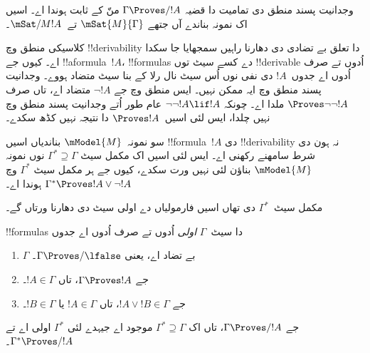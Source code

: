 \documentclass[../../../include/open-logic-section]{subfiles}
\begin{document}


وجدانیت پسند منطق دی تمامیت دا قضیہ $\Gamma \Proves/ !A$ منّ کے ثابت
ہوندا اے۔ اسیں اک نمونہ بناندے آں جتھے $\mSat{M}{\Gamma}$ تے~$\mSat/{M}{!A}$۔

کلاسیکی منطق وچ !!{derivability} دا تعلق بے تضادی دی دھارنا راہیں سمجھایا
جا سکدا اے۔ کیوں جے !!a{formula}~$!A$، !!{formula}s دے کسے سیٹ توں !!{derivable}
اُدوں تے صرف اُدوں اے جدوں~$!A$ دی نفی نوں اُس سیٹ نال رلا کے بنا سیٹ متضاد
ہووے۔ وجدانیت پسند منطق وچ ایہ ممکن نہیں۔ ایس منطق وچ جے $\lnot!A$ متضاد
اے، تاں صرف $\Proves \lnot\lnot !A$ ملدا اے۔ چونکہ $\lnot\lnot!A \lif !A$
عام طور اُتے وجدانیت پسند منطق وچ نہیں چلدا، ایس لئی اسیں~$\Proves !A$ دا
نتیجہ نہیں کڈھ سکدے۔

سو نمونہ~$\mModel{M}$ بناندیاں اسیں !!{formula}~$!A$ دی !!{derivability} نہ ہون دی شرط
سامھنے رکھنی اے۔ ایس لئی اسیں اک مکمل سیٹ $\Gamma^* \supseteq \Gamma$ نوں
نمونہ $\mModel{M}$ بناؤن لئی نہیں ورت سکدے،
کیوں جے ہر مکمل سیٹ $\Gamma^*$ وچ $\Gamma^* \Proves !A \lor \lnot !A$ ہوندا اے۔

مکمل سیٹ~$\Gamma^*$ دی تھاں اسیں فارمولیاں دے اولی سیٹ دی دھارنا ورتاں گے۔

\begin{defn}
  !!{formula}s دا سیٹ~$\Gamma$ \emph{اولی} اُدوں تے صرف اُدوں اے جدوں
  \begin{enumerate}
  \item{} $\Gamma$ بے تضاد اے، یعنی $\Gamma \Proves/ \lfalse$۔
  \item{} جے $\Gamma \Proves !A$، تاں $!A \in \Gamma$۔
  \item{} جے $!A \lor !B \in \Gamma$، تاں $!A \in
    \Gamma$ یا $!B \in \Gamma$۔
  \end{enumerate}
\end{defn}

\begin{lem}
   جے $\Gamma \Proves/ !A$، تاں اک
  $\Gamma^* \supseteq \Gamma$ موجود اے جیہدے لئی $\Gamma^*$ اولی اے تے
  $\Gamma^* \Proves/ !A$۔
\end{lem}
\end{document}
